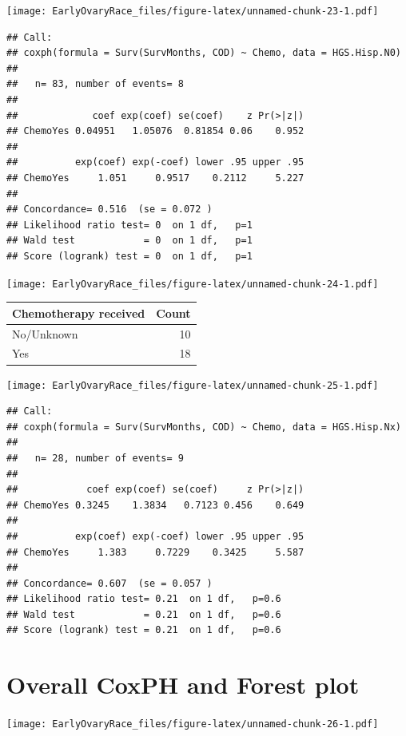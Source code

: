 \documentclass[
]{article}
\begin{document}
\texttt{[image: EarlyOvaryRace\_files/figure-latex/unnamed-chunk-23-1.pdf]}

\begin{verbatim}
## Call:
## coxph(formula = Surv(SurvMonths, COD) ~ Chemo, data = HGS.Hisp.N0)
## 
##   n= 83, number of events= 8 
## 
##             coef exp(coef) se(coef)    z Pr(>|z|)
## ChemoYes 0.04951   1.05076  0.81854 0.06    0.952
## 
##          exp(coef) exp(-coef) lower .95 upper .95
## ChemoYes     1.051     0.9517    0.2112     5.227
## 
## Concordance= 0.516  (se = 0.072 )
## Likelihood ratio test= 0  on 1 df,   p=1
## Wald test            = 0  on 1 df,   p=1
## Score (logrank) test = 0  on 1 df,   p=1
\end{verbatim}

\texttt{[image: EarlyOvaryRace\_files/figure-latex/unnamed-chunk-24-1.pdf]}

\begin{tabular}[t]{l|r}
\hline
Chemotherapy received & Count\\
\hline
No/Unknown & 10\\
\hline
Yes & 18\\
\hline
\end{tabular}

\texttt{[image: EarlyOvaryRace\_files/figure-latex/unnamed-chunk-25-1.pdf]}

\begin{verbatim}
## Call:
## coxph(formula = Surv(SurvMonths, COD) ~ Chemo, data = HGS.Hisp.Nx)
## 
##   n= 28, number of events= 9 
## 
##            coef exp(coef) se(coef)     z Pr(>|z|)
## ChemoYes 0.3245    1.3834   0.7123 0.456    0.649
## 
##          exp(coef) exp(-coef) lower .95 upper .95
## ChemoYes     1.383     0.7229    0.3425     5.587
## 
## Concordance= 0.607  (se = 0.057 )
## Likelihood ratio test= 0.21  on 1 df,   p=0.6
## Wald test            = 0.21  on 1 df,   p=0.6
## Score (logrank) test = 0.21  on 1 df,   p=0.6
\end{verbatim}

\hypertarget{overall-coxph-and-forest-plot}{%
\section{Overall CoxPH and Forest
plot}\label{overall-coxph-and-forest-plot}}

\texttt{[image: EarlyOvaryRace\_files/figure-latex/unnamed-chunk-26-1.pdf]}
\end{document}
